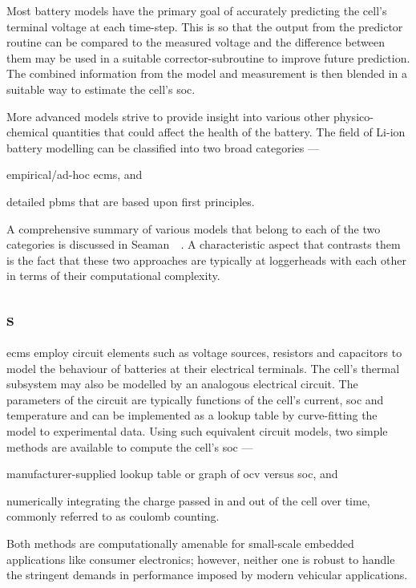 Most battery  models have the primary  goal of accurately predicting  the cell's
terminal  voltage  at each  time-step.  This  is so  that  the  output from  the
predictor routine  can be compared  to the  measured voltage and  the difference
between them  may be used in  a suitable corrector-subroutine to  improve future
prediction.  The combined  information from  the model  and measurement  is then
blended in a suitable way to estimate the cell's \gls{soc}.

More   advanced  models   strive   to  provide   insight   into  various   other
physico-chemical quantities  that could  affect the health  of the  battery. The
field of  Li-ion battery modelling can  be classified into two  broad categories
---
\begin{enumerate*}[label=\roman*)]
    \item empirical/ad-hoc \glspl{ecm}, and
    \item detailed  \glspl{pbm} that are based  upon first principles.
\end{enumerate*}
A  comprehensive summary  of  various models  that  belong to  each  of the  two
categories  is  discussed  in Seaman~\etal~\cite{Seaman2014}.  A  characteristic
aspect that contrasts  them is the fact that these  two approaches are typically
at loggerheads with each other in terms of their computational complexity.

\subsection{s}\label{subsec:ecms}

\glspl{ecm}  employ circuit  elements  such as  voltage  sources, resistors  and
capacitors to  model the behaviour  of batteries at their  electrical terminals.
The cell's  thermal subsystem may  also be  modelled by an  analogous electrical
circuit. The  parameters of the  circuit are  typically functions of  the cell's
current, \gls{soc} and  temperature and can be implemented as  a lookup table by
curve-fitting  the model  to experimental  data. Using  such equivalent  circuit
models, two simple methods are available to compute the cell's \gls{soc} ---
\begin{enumerate*}[label=\itshape\alph*\upshape)]
    \item manufacturer-supplied  lookup table or graph of \gls{ocv} versus \gls{soc}, and
    \item numerically integrating the charge passed in and out of the cell over time, commonly referred to as coulomb counting.
\end{enumerate*}
Both methods are computationally  amenable for small-scale embedded applications
like  consumer  electronics;  however,  neither  one is  robust  to  handle  the
stringent demands in performance imposed  by modern vehicular applications.

